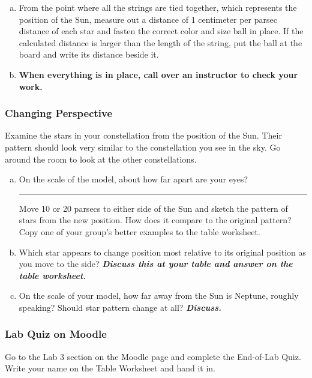 \documentclass[main.tex]{subfiles}
\begin{document}
\begin{enumerate} [a.]
(ii) Luminosity class: I-large; II or III-medium; IV or V-small
\newline
\newline 
If your star has an unusual classification try googling it for more information and choose the closest representation for it that you can. Write down the color and size of the ball you decide best represents your star on the table worksheet.
    \item From the point where all the strings are tied together, which represents the position of the Sun, measure out a distance of 1 centimeter per parsec distance of each star and fasten the correct color and size ball in place. If the calculated distance is larger than the length of the string, put the ball at the board and write its distance beside it.
    \item \textbf{When everything is in place, call over an instructor to check your work.}
\end{enumerate}

\subsubsection{Changing Perspective}
Examine the stars in your constellation from the position of the Sun. Their pattern should look very similar to the constellation you see in the sky. Go around the room to look at the other constellations. 
\begin{enumerate} [a.]
    \item On the scale of the model, about how far apart are your eyes?\rule{2cm}{.15mm} 
    \newline 
Move 10 or 20 parsecs to either side of the Sun and sketch the pattern of stars from the new position. How does it compare to the original pattern?
\newline
Copy one of your group's better examples to the table worksheet.
\item Which star appears to change position most relative to its original position as you move to the side? \textbf{\textit{Discuss this at your table and answer on the table worksheet.}}
\item On the scale of your model, how far away from the Sun is Neptune, roughly speaking? Should star pattern change at all? \textbf{\textit{Discuss.}}
\end{enumerate}

\subsubsection{Lab Quiz on Moodle}
Go to the Lab 3 section on the Moodle page and complete the End-of-Lab Quiz. Write your name on the Table Worksheet and hand it in.
\end{document}
